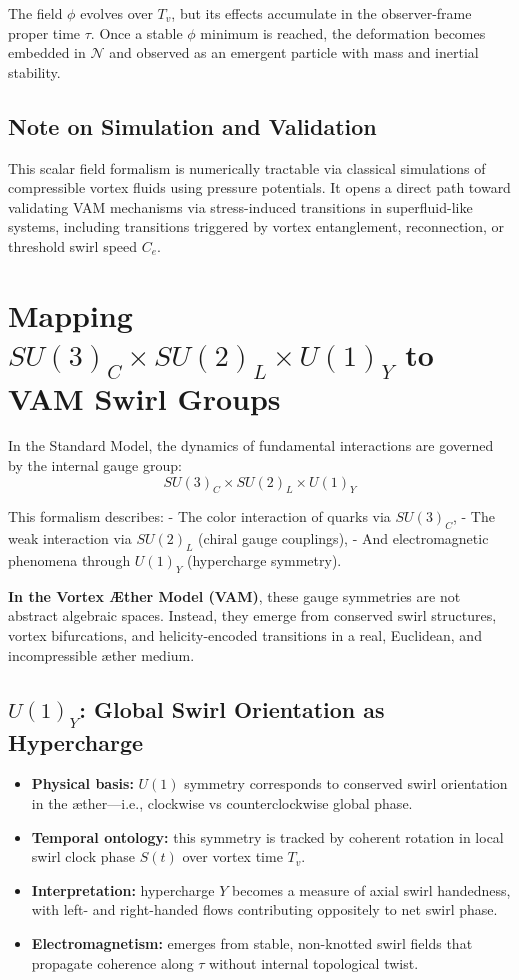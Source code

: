 \documentclass[12pt]{article}
\begin{document}
The field $\phi$ evolves over $T_v$, but its effects accumulate in the observer-frame proper time $\tau$. Once a stable $\phi$ minimum is reached, the deformation becomes embedded in $\mathcal{N}$ and observed as an emergent particle with mass and inertial stability.

\subsection*{Note on Simulation and Validation}

This scalar field formalism is numerically tractable via classical simulations of compressible vortex fluids using pressure potentials. It opens a direct path toward validating VAM mechanisms via stress-induced transitions in superfluid-like systems, including transitions triggered by vortex entanglement, reconnection, or threshold swirl speed $C_e$.


\section{Mapping \texorpdfstring{$SU(3)_C \times SU(2)_L \times U(1)_Y$}{SU(3) x SU(2) x U(1)} to VAM Swirl Groups}

In the Standard Model, the dynamics of fundamental interactions are governed by the internal gauge group:
\[
SU(3)_C \times SU(2)_L \times U(1)_Y
\]

This formalism describes:
- The color interaction of quarks via $SU(3)_C$,
- The weak interaction via $SU(2)_L$ (chiral gauge couplings),
- And electromagnetic phenomena through $U(1)_Y$ (hypercharge symmetry).

\textbf{In the Vortex \AE{}ther Model (VAM)}, these gauge symmetries are not abstract algebraic spaces. Instead, they emerge from conserved swirl structures, vortex bifurcations, and helicity-encoded transitions in a real, Euclidean, and incompressible æther medium.

\subsection{$U(1)_Y$: Global Swirl Orientation as Hypercharge}

\begin{itemize}
    \item \textbf{Physical basis:} $U(1)$ symmetry corresponds to conserved swirl orientation in the æther—i.e., clockwise vs counterclockwise global phase.
    \item \textbf{Temporal ontology:} this symmetry is tracked by coherent rotation in local swirl clock phase $S(t)$ over vortex time $T_v$.
    \item \textbf{Interpretation:} hypercharge $Y$ becomes a measure of axial swirl handedness, with left- and right-handed flows contributing oppositely to net swirl phase.
    \item \textbf{Electromagnetism:} emerges from stable, non-knotted swirl fields that propagate coherence along $\tau$ without internal topological twist.
\end{itemize}
\end{document}
